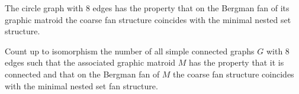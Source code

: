 The circle graph with 8 edges has the property that on the Bergman fan of its graphic matroid the coarse fan structure coincides with the minimal nested set structure.

Count up to isomorphism the number of all simple connected graphs $G$ with 8 edges such that the associated graphic matroid $M$ has the property that it is connected and that on the Bergman fan of $M$ the coarse fan structure coincides with the minimal nested set fan structure.
